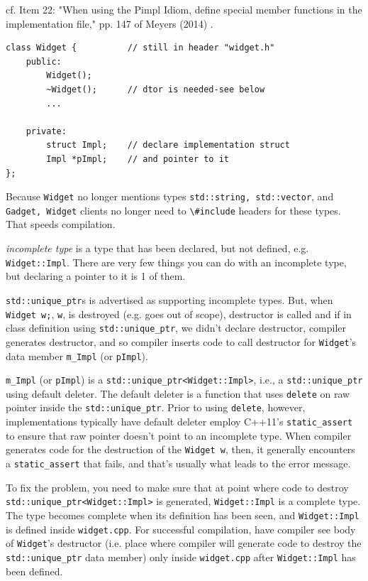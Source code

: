 \documentclass[10pt]{amsart}
\begin{document}
\begin{multicols*}{2}
cf. Item 22: "When using the Pimpl Idiom, define special member functions in the implementation file," pp. 147 of Meyers (2014) \cite{ScMe2014}.  

\begin{lstlisting}
class Widget { 			// still in header "widget.h" 
	public:
		Widget();
		~Widget();		// dtor is needed-see below 
		... 
	
	private:
		struct Impl;	// declare implementation struct 
		Impl *pImpl;	// and pointer to it
};
\end{lstlisting}

Because \verb|Widget| no longer mentions types \verb|std::string, std::vector|, and \verb|Gadget, Widget| clients no longer need to \verb|\#include| headers for these types.  That speeds compilation.  

\emph{incomplete type} is a type that has been declared, but not defined, e.g. \verb|Widget::Impl|.  There are very few things you can do with an incomplete type, but declaring a pointer to it is 1 of them.  

\verb|std::unique_ptr|s is advertised as supporting incomplete types.  But, when \verb|Widget w;|, \verb|w|, is destroyed (e.g. goes out of scope), destructor is called and if in class definition using \verb|std::unique_ptr|, we didn't declare destructor, compiler generates destructor, and so compiler inserts code to call destructor for \verb|Widget|'s data member \verb|m_Impl| (or \verb|pImpl|).  

\verb|m_Impl| (or \verb|pImpl|) is a \verb|std::unique_ptr<Widget::Impl>|, i.e., a \verb|std::unique_ptr| using default deleter. The default deleter is a function that uses \verb|delete| on raw pointer inside the \verb|std::unique_ptr|.  Prior to using \verb|delete|, however, implementations typically have default deleter employ C++11's \verb|static_assert| to ensure that raw pointer doesn't point to an incomplete type.  When compiler generates code for the destruction of the \verb|Widget w|, then, it generally encounters a \verb|static_assert| that fails, and that's usually what leads to the error message.  

To fix the problem, you need to make sure that at point where code to destroy \verb|std::unique_ptr<Widget::Impl>| is generated, \verb|Widget::Impl| is a complete type.  The type becomes complete when its definition has been seen, and \verb|Widget::Impl| is defined inside \verb|widget.cpp|.  For successful compilation, have compiler see body of \verb|Widget|'s destructor (i.e. place where compiler will generate code to destroy the \verb|std::unique_ptr| data member) only inside \verb|widget.cpp| after \verb|Widget::Impl| has been defined.  


\end{multicols*}
\end{document}
